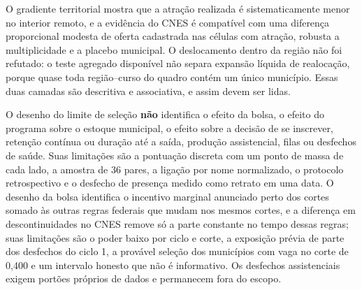 \documentclass[11pt,a4paper]{article}
\begin{document}
O gradiente territorial mostra que a atração realizada é sistematicamente menor
no interior remoto, e a evidência do CNES é compatível com uma diferença
proporcional modesta de oferta cadastrada nas células com atração, robusta a
multiplicidade e a placebo municipal. O deslocamento dentro da região não foi
refutado: o teste agregado disponível não separa expansão líquida de
realocação, porque quase toda região--curso do quadro contém um único
município. Essas duas camadas são descritiva e associativa, e assim devem ser
lidas.

O desenho do limite de seleção \textbf{não} identifica o efeito da bolsa, o
efeito do programa sobre o estoque municipal, o efeito sobre a decisão de se
inscrever, retenção contínua ou duração até a saída, produção assistencial,
filas ou desfechos de saúde. Suas limitações são a pontuação discreta com um
ponto de massa de cada lado, a amostra de 36 pares, a ligação por nome
normalizado, o protocolo retrospectivo e o desfecho de presença medido como
retrato em uma data. O desenho da bolsa identifica o incentivo marginal
anunciado perto dos cortes somado às outras regras federais que mudam nos
mesmos cortes, e a diferença em descontinuidades no CNES remove só a parte
constante no tempo dessas regras; suas limitações são o poder baixo por ciclo
e corte, a exposição prévia de parte dos desfechos do ciclo 1, a provável
seleção dos municípios com vaga no corte de 0,400 e um intervalo honesto que
não é informativo. Os desfechos
assistenciais exigem portões próprios de dados e permanecem fora do escopo.
\end{document}
